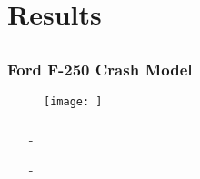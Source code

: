 \chapter{Results}
\label{chp:results}

\section{}

\subsection{Ford F-250 Crash Model}

\begin{figure}[htbp]
	\centering
		\texttt{[image: ]}
	\caption{}
	\label{}
\end{figure}

\subsection{}

\begin{itemize}
	\item[-]
	\item[-]
\end{itemize}

